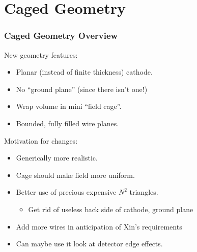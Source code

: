 \documentclass[xcolor=dvipsnames]{beamer}
\begin{document}
\section{Caged Geometry}


\begin{frame}
  \frametitle{Caged Geometry Overview}

  New geometry features:
  \begin{itemize}
  \item Planar (instead of finite thickness) cathode.
  \item No ``ground plane'' (since there isn't one!)
  \item Wrap volume in mini ``field cage''.
  \item Bounded, fully filled wire planes.
  \end{itemize}

  \vfill

  Motivation for changes:
  \begin{itemize}
  \item Generically more realistic.
  \item Cage should make field more uniform.
  \item Better use of precious expensive $N^2$ triangles.
    \begin{itemize}\scriptsize
    \item Get rid of useless back side of cathode, ground plane
    \end{itemize}
  \item Add more wires in anticipation of Xin's requirements
  \item Can maybe use it look at detector edge effects.
  \end{itemize}
\end{frame}
\end{document}
